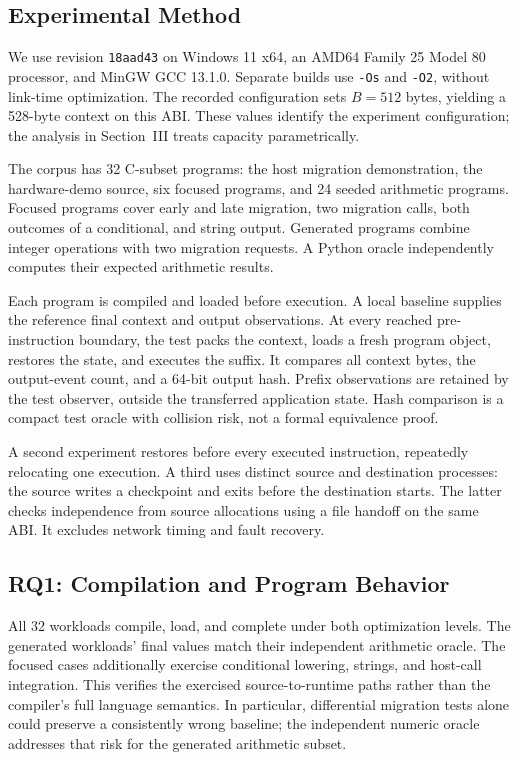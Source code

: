 \documentclass[conference,letterpaper]{IEEEtran}
\newcommand{\code}[1]{\texttt{#1}}
\begin{document}
\subsection{Experimental Method}
We use revision \code{18aad43} on Windows 11 x64, an AMD64 Family 25 Model 80 processor, and MinGW GCC 13.1.0. Separate builds use \code{-Os} and \code{-O2}, without link-time optimization. The recorded configuration sets $B=512$ bytes, yielding a 528-byte context on this ABI. These values identify the experiment configuration; the analysis in Section~III treats capacity parametrically.

The corpus has 32 C-subset programs: the host migration demonstration, the hardware-demo source, six focused programs, and 24 seeded arithmetic programs. Focused programs cover early and late migration, two migration calls, both outcomes of a conditional, and string output. Generated programs combine integer operations with two migration requests. A Python oracle independently computes their expected arithmetic results.

Each program is compiled and loaded before execution. A local baseline supplies the reference final context and output observations. At every reached pre-instruction boundary, the test packs the context, loads a fresh program object, restores the state, and executes the suffix. It compares all context bytes, the output-event count, and a 64-bit output hash. Prefix observations are retained by the test observer, outside the transferred application state. Hash comparison is a compact test oracle with collision risk, not a formal equivalence proof.

A second experiment restores before every executed instruction, repeatedly relocating one execution. A third uses distinct source and destination processes: the source writes a checkpoint and exits before the destination starts. The latter checks independence from source allocations using a file handoff on the same ABI. It excludes network timing and fault recovery.

\subsection{RQ1: Compilation and Program Behavior}
All 32 workloads compile, load, and complete under both optimization levels. The generated workloads' final values match their independent arithmetic oracle. The focused cases additionally exercise conditional lowering, strings, and host-call integration. This verifies the exercised source-to-runtime paths rather than the compiler's full language semantics. In particular, differential migration tests alone could preserve a consistently wrong baseline; the independent numeric oracle addresses that risk for the generated arithmetic subset.
\end{document}
